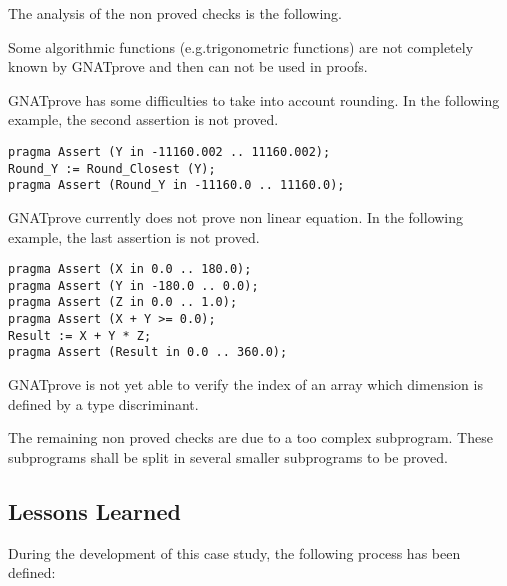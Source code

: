 \documentclass[10pt,a4paper,twocolumn]{article}
\newcommand{\gnatprove}{GNATprove\xspace}
\begin{document}
\vspace{5mm}

The analysis of the non proved checks is the following.

Some algorithmic functions (e.g.trigonometric functions) are not completely known by \gnatprove and then can not be used in proofs.

\gnatprove has some difficulties to take into account rounding.
In the following example, the second assertion is not proved.
\begin{lstlisting}
pragma Assert (Y in -11160.002 .. 11160.002);
Round_Y := Round_Closest (Y);
pragma Assert (Round_Y in -11160.0 .. 11160.0);
\end{lstlisting}
\gnatprove currently does not prove non linear equation.
In the following example, the last assertion is not proved.
\begin{lstlisting}
pragma Assert (X in 0.0 .. 180.0);
pragma Assert (Y in -180.0 .. 0.0);
pragma Assert (Z in 0.0 .. 1.0);
pragma Assert (X + Y >= 0.0);
Result := X + Y * Z;
pragma Assert (Result in 0.0 .. 360.0);
\end{lstlisting}
\gnatprove is not yet able to verify the index of an array which dimension is defined by a type discriminant.

The remaining non proved checks are due to a too complex subprogram.
These subprograms shall be split in several smaller subprograms to be proved.

\subsection{Lessons Learned}

During the development of this case study, the following process has been defined:
\end{document}
